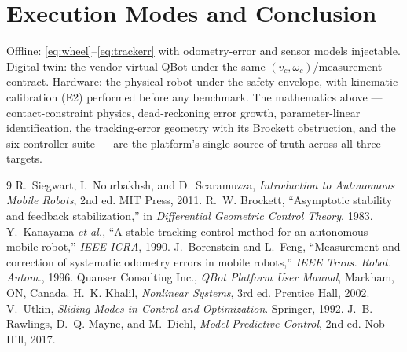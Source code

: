 \documentclass[conference]{IEEEtran}
\begin{document}
\section{Execution Modes and Conclusion}
Offline: \eqref{eq:wheel}--\eqref{eq:trackerr} with odometry-error and sensor models injectable. Digital twin: the vendor virtual QBot under the same $(v_c,\omega_c)$/measurement contract. Hardware: the physical robot under the safety envelope, with kinematic calibration (E2) performed before any benchmark. The mathematics above --- contact-constraint physics, dead-reckoning error growth, parameter-linear identification, the tracking-error geometry with its Brockett obstruction, and the six-controller suite --- are the platform's single source of truth across all three targets.


\begin{thebibliography}{9}
 R.~Siegwart, I.~Nourbakhsh, and D.~Scaramuzza, \emph{Introduction to Autonomous Mobile Robots}, 2nd ed. MIT Press, 2011.
 R.~W. Brockett, ``Asymptotic stability and feedback stabilization,'' in \emph{Differential Geometric Control Theory}, 1983.
 Y.~Kanayama \emph{et al.}, ``A stable tracking control method for an autonomous mobile robot,'' \emph{IEEE ICRA}, 1990.
 J.~Borenstein and L.~Feng, ``Measurement and correction of systematic odometry errors in mobile robots,'' \emph{IEEE Trans. Robot. Autom.}, 1996.
 Quanser Consulting Inc., \emph{QBot Platform User Manual}, Markham, ON, Canada.
 H.~K. Khalil, \emph{Nonlinear Systems}, 3rd ed. Prentice Hall, 2002.
 V.~Utkin, \emph{Sliding Modes in Control and Optimization}. Springer, 1992.
 J.~B. Rawlings, D.~Q. Mayne, and M.~Diehl, \emph{Model Predictive Control}, 2nd ed. Nob Hill, 2017.
\end{thebibliography}
\end{document}
